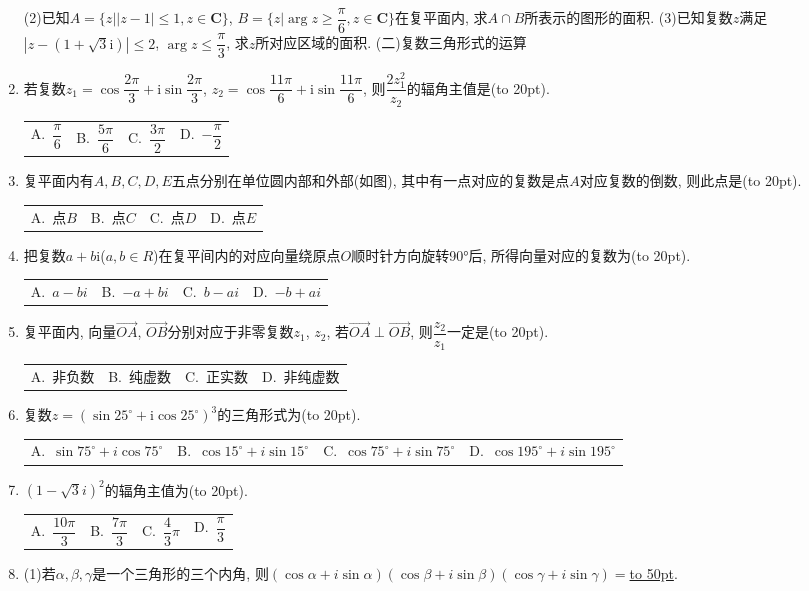 \documentclass[10pt,a4paper]{article}
\newcommand{\blank}[1]{\underline{\hbox to #1pt{}}}
\newcommand{\bracket}[1]{(\hbox to #1pt{})}
\newcommand{\fourch}[4]{\par\begin{tabular}{p{.23\textwidth}p{.23\textwidth}p{.23\textwidth}p{.23\textwidth}}
A.~#1 &B.~#2& C.~#3& D.~#4
\end{tabular}}
\begin{document}
\begin{enumerate}[1.]
(2)已知$A=\{z||z-1|\le 1,z\in \mathbf{C}\}$, $B=\{z|\arg z\ge \dfrac{\pi }6,z\in \mathbf{C}\}$在复平面内, 求$A\cap B$所表示的图形的面积.
(3)已知复数$z$满足$|z-(1+\sqrt 3\mathrm{i})|\le 2$, $\arg z\le \dfrac{\pi }3$, 求$z$所对应区域的面积.
(二)复数三角形式的运算
\item 若复数$z_1=\cos \dfrac{2\pi }3+\mathrm{i}\sin \dfrac{2\pi }3$, $z_2=\cos \dfrac{11\pi }6+\mathrm{i}\sin \dfrac{11\pi }6$, 则$\dfrac{2z_1^2}{z_2}$的辐角主值是\bracket{20}.
\fourch{$\dfrac{\pi }6$}{$\dfrac{5\pi }6$}{$\dfrac{3\pi }2$}{$-\dfrac{\pi }2$}
\item 复平面内有$A,B,C,D,E$五点分别在单位圆内部和外部(如图), 其中有一点对应的复数是点$A$对应复数的倒数, 则此点是\bracket{20}.
\begin{center}
\end{center}
\fourch{点$B$}{点$C$}{点$D$}{点$E$}
\item 把复数$a+b\mathrm{i}$($a,b\in R$)在复平间内的对应向量绕原点$O$顺时针方向旋转90°后, 所得向量对应的复数为\bracket{20}.
\fourch{$a-bi$}{$-a+bi$}{$b-ai$}{$-b+ai$}
\item 复平面内, 向量$\overrightarrow{OA}$, $\overrightarrow{OB}$分别对应于非零复数$z_1$, $z_2$, 若$\overrightarrow{OA}\perp \overrightarrow{OB}$, 则$\dfrac{z_2}{z_1}$一定是\bracket{20}.
\fourch{非负数}{纯虚数}{正实数}{非纯虚数}
\item 复数$z=(\sin 25^\circ +\mathrm{i}\cos 25^\circ)^3$的三角形式为\bracket{20}.
\fourch{$\sin 75^\circ +i\cos 75^\circ$}{$\cos 15^\circ +i\sin 15^\circ$}{$\cos 75^\circ +i\sin 75^\circ$}{$\cos 195^\circ +i\sin 195^\circ$}
\item $(1-\sqrt 3i)^2$的辐角主值为\bracket{20}.
\fourch{$\dfrac{10\pi }3$}{$\dfrac{7\pi }3$}{$\dfrac 43\pi$}{$\dfrac{\pi }3$}
\item (1)若$\alpha ,\beta ,\gamma$是一个三角形的三个内角, 则$(\cos \alpha +i\sin \alpha)(\cos \beta +i\sin \beta)(\cos \gamma +i\sin \gamma)=$\blank{50}.

\end{enumerate}
\end{document}
